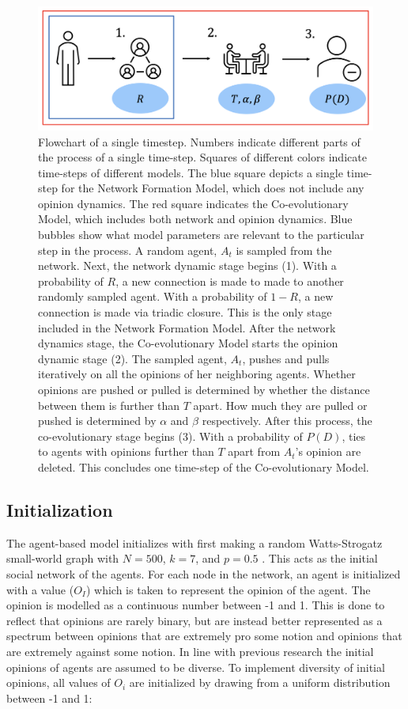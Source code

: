 \documentclass{article}
\begin{document}
\begin{figure}[H]
  \centering
  \includegraphics[width=.9\linewidth]{../plots/schematics/model_representation.png}
\caption{Flowchart of a single timestep. Numbers indicate different parts of the process of a single time-step. Squares of different colors indicate time-steps of different models. The blue square depicts a single time-step for the Network Formation Model, which does not include any opinion dynamics. The red square indicates the Co-evolutionary Model, which includes both network and opinion dynamics. Blue bubbles show what model parameters are relevant to the particular step in the process. A random agent, $A_t$ is sampled from the network. Next, the network dynamic stage begins (1). With a probability of $R$, a new connection is made to made to another randomly sampled agent. With a probability of $1-R$, a new connection is made via triadic closure. This is the only stage included in the Network Formation Model. After the network dynamics stage, the Co-evolutionary Model starts the opinion dynamic stage (2). The sampled agent, $A_t$, pushes and pulls iteratively on all the opinions of her neighboring agents. Whether opinions are pushed or pulled is determined by whether the distance between them is further than $T$ apart. How much they are pulled or pushed is determined by $\alpha$ and $\beta$ respectively. After this process, the co-evolutionary stage begins (3). With a probability of $P(D)$, ties to agents with opinions further than $T$ apart from $A_t$'s opinion are deleted. This concludes one time-step of the Co-evolutionary Model.}
\label{fig:flowchart}
\end{figure}


\subsection{Initialization}
The agent-based model initializes with first making a random Watts-Strogatz small-world graph
with $N=500$, $k=7$, and $p=0.5$ \cite{watts_collective_1998}. This acts as the initial social network of the agents. For each node in the network,
an agent is initialized with a value ($O_I$) which is taken to represent the opinion of the agent. The opinion is modelled as a continuous number between -1 and 1. 
This is done to reflect that opinions are rarely binary, but are instead better represented as a spectrum between opinions that are extremely pro some notion and opinions that are extremely against some notion.
In line with previous research the initial opinions of agents are assumed to be diverse. To implement diversity of initial opinions, all values of $O_i$ are initialized by drawing from a uniform distribution between -1 and 1: 
\end{document}
